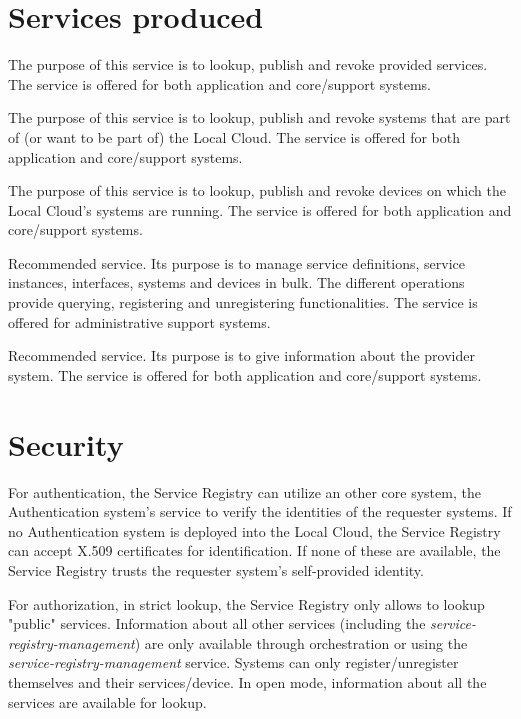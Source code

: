 \documentclass[a4paper]{arrowhead}
\begin{document}
\newpage

\section{Services produced}
\label{sec:services}

The purpose of this service is to lookup, publish and revoke provided services. The service is offered for both application and core/support systems. 

The purpose of this service is to lookup, publish and revoke systems that are part of (or want to be part of) the Local Cloud. The service is offered for both application and core/support systems. 

The purpose of this service is to lookup, publish and revoke devices on which the Local Cloud's systems are running. The service is offered for both application and core/support systems. 

Recommended service.  Its purpose is to manage service definitions, service instances, interfaces, systems and devices in bulk. The different operations provide querying, registering and unregistering functionalities. The service is offered for administrative support systems. 

Recommended service. Its purpose is to give information about the provider system. The service is offered for both application and core/support systems.

\newpage

\section{Security}
\label{sec:security}

For authentication, the Service Registry can utilize an other core system, the Authentication system's service to verify the identities of the requester systems. If no Authentication system is deployed into the Local Cloud, the Service Registry can accept X.509 certificates for identification. If none of these are available, the Service Registry trusts the requester system's self-provided identity.

For authorization, in strict lookup, the Service Registry only allows to lookup "public" services. Information about all other services (including the \textit{service-registry-management}) are only available through orchestration or using the \textit{service-registry-management} service. Systems can only register/unregister themselves and their services/device. In open mode, information about all the services are available for lookup.
\end{document}
